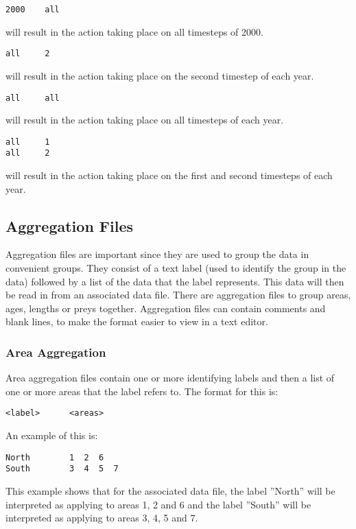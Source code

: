 \documentclass [a4paper, 10pt]{book}
\begin{document}
\begin{verbatim}
2000    all
\end{verbatim}
will result in the action taking place on all timesteps of 2000.

\begin{verbatim}
all     2
\end{verbatim}
will result in the action taking place on the second timestep of each year.

\begin{verbatim}
all     all
\end{verbatim}
will result in the action taking place on all timesteps of each year.

\begin{verbatim}
all     1
all     2
\end{verbatim}
will result in the action taking place on the first and second timesteps of each year.

\subsection{Aggregation Files}
Aggregation files are important since they are used to group the data in convenient groups.  They consist of a text label (used to identify the group in the data) followed by a list of the data that the label represents.  This data will then be read in from an associated data file.  There are aggregation files to group areas, ages, lengths or preys together.  Aggregation files can contain comments and blank lines, to make the format easier to view in a text editor.

\subsubsection{Area Aggregation}
Area aggregation files contain one or more identifying labels and then a list of one or more areas that the label refers to.  The format for this is:

\begin{verbatim}
<label>      <areas>
\end{verbatim}

An example of this is:

\begin{verbatim}
North        1  2  6
South        3  4  5  7
\end{verbatim}

This example shows that for the associated data file, the label ''North'' will be interpreted as applying to areas 1, 2 and 6 and the label ''South'' will be interpreted as applying to areas 3, 4, 5 and 7.
\end{document}
